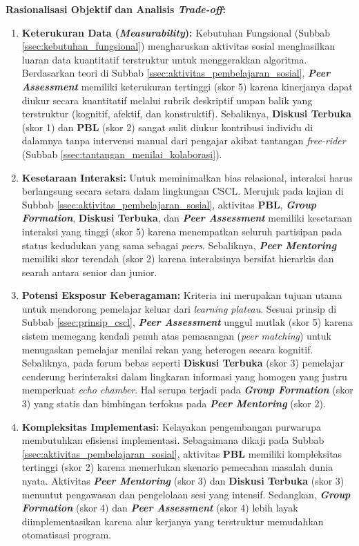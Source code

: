 \textbf{Rasionalisasi Objektif dan Analisis \textit{Trade-off}:}
\begin{enumerate}
    \item \textbf{Keterukuran Data (\textit{Measurability}):} Kebutuhan Fungsional (Subbab \ref{ssec:kebutuhan_fungsional}) mengharuskan aktivitas sosial menghasilkan luaran data kuantitatif terstruktur untuk menggerakkan algoritma. Berdasarkan teori di Subbab \ref{ssec:aktivitas_pembelajaran_sosial}, \textbf{\textit{Peer Assessment}} memiliki keterukuran tertinggi (skor 5) karena kinerjanya dapat diukur secara kuantitatif melalui rubrik deskriptif umpan balik yang terstruktur (kognitif, afektif, dan konstruktif). Sebaliknya, \textbf{Diskusi Terbuka} (skor 1) dan \textbf{PBL} (skor 2) sangat sulit diukur kontribusi individu di dalamnya tanpa intervensi manual dari pengajar akibat tantangan \textit{free-rider} (Subbab \ref{ssec:tantangan_menilai_kolaborasi}).
    
    \item \textbf{Kesetaraan Interaksi:} Untuk meminimalkan bias relasional, interaksi harus berlangsung secara setara dalam lingkungan CSCL. Merujuk pada kajian di Subbab \ref{ssec:aktivitas_pembelajaran_sosial}, aktivitas \textbf{PBL}, \textbf{\textit{Group Formation}}, \textbf{Diskusi Terbuka}, dan \textbf{\textit{Peer Assessment}} memiliki kesetaraan interaksi yang tinggi (skor 5) karena menempatkan seluruh partisipan pada status kedudukan yang sama sebagai \textit{peers}. Sebaliknya, \textbf{\textit{Peer Mentoring}} memiliki skor terendah (skor 2) karena interaksinya bersifat hierarkis dan searah antara senior dan junior.
    
    \item \textbf{Potensi Eksposur Keberagaman:} Kriteria ini merupakan tujuan utama untuk mendorong pemelajar keluar dari \textit{learning plateau}. Sesuai prinsip di Subbab \ref{ssec:prinsip_cscl}, \textbf{\textit{Peer Assessment}} unggul mutlak (skor 5) karena sistem memegang kendali penuh atas pemasangan (\textit{peer matching}) untuk menugaskan pemelajar menilai rekan yang heterogen secara kognitif. Sebaliknya, pada forum bebas seperti \textbf{Diskusi Terbuka} (skor 3) pemelajar cenderung berinteraksi dalam lingkaran informasi yang homogen yang justru memperkuat \textit{echo chamber}. Hal serupa terjadi pada \textbf{\textit{Group Formation}} (skor 3) yang statis dan bimbingan terfokus pada \textbf{\textit{Peer Mentoring}} (skor 2).
    
    \item \textbf{Kompleksitas Implementasi:} Kelayakan pengembangan purwarupa membutuhkan efisiensi implementasi. Sebagaimana dikaji pada Subbab \ref{ssec:aktivitas_pembelajaran_sosial}, aktivitas \textbf{PBL} memiliki kompleksitas tertinggi (skor 2) karena memerlukan skenario pemecahan masalah dunia nyata. Aktivitas \textbf{\textit{Peer Mentoring}} (skor 3) dan \textbf{Diskusi Terbuka} (skor 3) menuntut pengawasan dan pengelolaan sesi yang intensif. Sedangkan, \textbf{\textit{Group Formation}} (skor 4) dan \textbf{\textit{Peer Assessment}} (skor 4) lebih layak diimplementasikan karena alur kerjanya yang terstruktur memudahkan otomatisasi program.
\end{enumerate}

